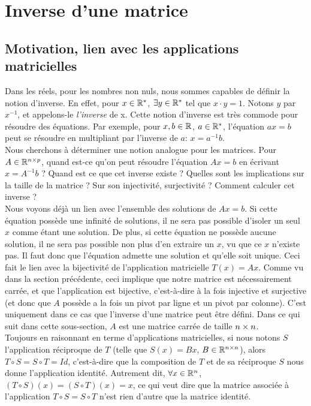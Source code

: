 \section{Inverse d'une matrice}

\subsection{Motivation, lien avec les applications matricielles}
\noindent Dans les réels, pour les nombres non nuls, nous sommes capables de définir la notion d'inverse. En effet, pour $x \in \mathbb{R}^*$, $\exists y \in \mathbb{R}^*$ tel que $x\cdot y = 1$. Notons $y$ par $x^{-1}$, et appelons-le \textit{l'inverse} de x. Cette notion d'inverse est très commode pour résoudre des équations. Par exemple, pour $x,b \in \mathbb{R}$, $a \in \mathbb{R}^*$, l'équation $ax=b$ peut se résoudre en multipliant par l'inverse de $a$: $x = a^{-1} b$.\\
Nous cherchons à déterminer une notion analogue pour les matrices. Pour $A \in \mathbb{R}^{n \times p}$, quand est-ce qu'on peut résoudre l'équation $Ax=b$ en écrivant $x = A^{-1}b$ ? Quand est ce que cet inverse existe ? Quelles sont les implications sur la taille de la matrice ? Sur son injectivité, surjectivité ? Comment calculer cet inverse ? \\

\noindent Nous voyons déjà un lien avec l'ensemble des solutions de $Ax=b$. Si cette équation possède une infinité de solutions, il ne sera pas possible d'isoler un seul $x$ comme étant une solution. De plus, si cette équation ne possède aucune solution, il ne sera pas possible non plus d'en extraire un $x$, vu que ce $x$ n'existe pas. Il faut donc que l'équation admette une solution et qu'elle soit unique. Ceci fait le lien avec la bijectivité de l'application matricielle $T(x) = Ax$. Comme vu dans la section précédente, ceci implique que notre matrice est nécessairement carrée, et que l'application est bijective, c'est-à-dire à la fois injective et surjective (et donc que $A$ possède a la fois un pivot par ligne et un pivot par colonne). C'est uniquement dans ce cas que l'inverse d'une matrice peut être défini. Dans ce qui suit dans cette sous-section, $A$ est une matrice carrée de taille $n \times n$.\\

\noindent Toujours en raisonnant en terme d'applications matricielles, si nous notons $S$ l'application réciproque de $T$ (telle que $S(x) = Bx$, $B \in \mathbb{R}^{n \times n}$), alors $T\circ S = S \circ T = Id$, c'est-à-dire que la composition de $T$ et de sa réciproque $S$ nous donne l'application identité. Autrement dit, $\forall x \in \mathbb{R}^n$, $(T\circ S)(x) = (S\circ T)(x) = x$, ce qui veut dire que la matrice associée à l'application $T \circ S = S \circ T$ n'est rien d'autre que la matrice identité. \\

